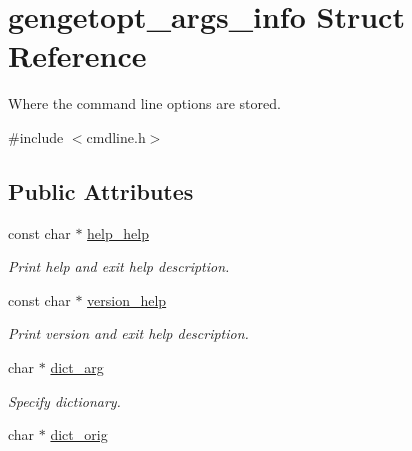 \hypertarget{structgengetopt__args__info}{}\section{gengetopt\+\_\+args\+\_\+info Struct Reference}
\label{structgengetopt__args__info}


Where the command line options are stored.  




{\ttfamily \#include $<$cmdline.\+h$>$}

\subsection*{Public Attributes}
\begin{DoxyCompactItemize}
\item 
\hypertarget{structgengetopt__args__info_afb4efa68a6f43a4d112e9b96ffe89101}{}const char $\ast$ \hyperlink{structgengetopt__args__info_afb4efa68a6f43a4d112e9b96ffe89101}{help\+\_\+help}\label{structgengetopt__args__info_afb4efa68a6f43a4d112e9b96ffe89101}

\begin{DoxyCompactList}\small\item\em Print help and exit help description. \end{DoxyCompactList}\item 
\hypertarget{structgengetopt__args__info_adef454ea6f3ff4114ae5009e58360cfc}{}const char $\ast$ \hyperlink{structgengetopt__args__info_adef454ea6f3ff4114ae5009e58360cfc}{version\+\_\+help}\label{structgengetopt__args__info_adef454ea6f3ff4114ae5009e58360cfc}

\begin{DoxyCompactList}\small\item\em Print version and exit help description. \end{DoxyCompactList}\item 
\hypertarget{structgengetopt__args__info_aa6eb268f2dd52792a2ca01fb40155b7c}{}char $\ast$ \hyperlink{structgengetopt__args__info_aa6eb268f2dd52792a2ca01fb40155b7c}{dict\+\_\+arg}\label{structgengetopt__args__info_aa6eb268f2dd52792a2ca01fb40155b7c}

\begin{DoxyCompactList}\small\item\em Specify dictionary. \end{DoxyCompactList}\item 
\hypertarget{structgengetopt__args__info_a81649888546ebb6d698841117e0bafb1}{}char $\ast$ \hyperlink{structgengetopt__args__info_a81649888546ebb6d698841117e0bafb1}{dict\+\_\+orig}\label{structgengetopt__args__info_a81649888546ebb6d698841117e0bafb1}


\end{DoxyCompactItemize}
